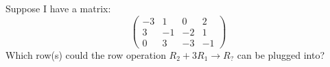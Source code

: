 \documentclass{ximera}
\author{Bart Snapp}
\begin{document}
\begin{exercise}
  Suppose I have a matrix:
  \[
  \begin{pmatrix}
    -3 & 1 & 0 & 2 \\
    3 & -1 & -2 & 1 \\
    0 & 3 & -3 & -1
  \end{pmatrix}
  \]
  Which row(s) could the row operation $R_2+3R_1\to R_?$ can be plugged into?
  \begin{prompt}
  \begin{selectAll}
  \end{selectAll}
  \end{prompt}
\end{exercise}
\end{document}
